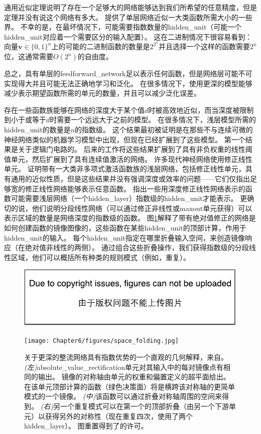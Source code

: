 通用近似定理说明了存在一个足够大的网络能够达到我们所希望的任意精度，但是定理并没有说这个网络有多大。
\cite{Barron93}提供了单层网络近似一大类函数所需大小的一些界。
不幸的是，在最坏情况下，可能需要指数数量的\gls{hidden_unit}（可能一个\gls{hidden_unit}对应着一个需要区分的输入配置）。
这在二进制情况下很容易看到：向量$\bm{v}\in \{0,1\}^n$上的可能的二进制函数的数量是$2^{2^n}$并且选择一个这样的函数需要$2^n$位，这通常需要$O(2^n)$的自由度。

总之，具有单层的\gls{feedforward_network}足以表示任何函数，但是网络层可能不可实现得大并且可能无法正确地学习和泛化。
在很多情况下，使用更深的模型能够减少表示期望函数所需的单元的数量，并且可以减少泛化误差。


存在一些函数族能够在网络的深度大于某个值$d$时被高效地近似，而当深度被限制到小于或等于$d$时需要一个远远大于之前的模型。
在很多情况下，浅层模型所需的\gls{hidden_unit}的数量是$n$的指数级。
这个结果最初被证明是在那些不与连续可微的神经网络类似的机器学习模型中出现，但现在已经扩展到了这些模型。
第一个结果是关于逻辑门电路的\citep{Hastad86}。
后来的工作将这些结果扩展到了具有非负权重的线性阈值单元\citep{Hastad91,Hajnal-et-al-1993}，然后扩展到了具有连续值激活的网络\citep{Maass-1992,Maass-et-al-1994}。
许多现代神经网络使用修正线性单元。
\cite{Leshno-et-al-1993}证明带有一大类非多项式激活函数族的浅层网络，包括修正线性单元，具有通用的近似性质，但是这些结果并没有强调深度或效率的问题——它们仅指出足够宽的修正线性网络能够表示任意函数。
\cite{Montufar-et-al-NIPS2014}指出一些用深度修正线性网络表示的函数可能需要浅层网络（一个\gls{hidden_layer}）指数级的\gls{hidden_unit}才能表示。
更确切的说，他们说明分段线性网络（可以通过修正非线性或maxout单元获得）可以表示区域的数量是网络深度的指数级的函数。
图\ref{fig:chap6_space_folding}解释了带有绝对值修正的网络是如何创建函数的镜像图像的，这些函数在某些\gls{hidden_unit}的顶部计算，作用于\gls{hidden_unit}的输入。
每个\gls{hidden_unit}指定在哪里折叠输入空间，来创造镜像响应（在绝对值非线性的两侧）。
通过组合这些折叠操作，我们获得指数级的分段线性区域，他们可以概括所有种类的规则模式（例如，重复）。
\begin{figure}[!htb]
\ifOpenSource
\centerline{\includegraphics{figure.pdf}}
\else
\centerline{\texttt{[image: Chapter6/figures/space\_folding.jpg]}}
\fi
\caption{%
关于更深的整流网络具有指数优势的一个直观的几何解释，来自\cite{Montufar-et-al-NIPS2014}。 
\emph{(左)}\gls{absolute_value_rectification}单元对其输入中的每对镜像点有相同的输出。
镜像的对称轴由单元的权重和偏置定义的超平面给出。 在该单元顶部计算的函数（绿色决策面）将是横跨该对称轴的更简单模式的一个镜像。 
\emph{(中)}该函数可以通过折叠对称轴周围的空间来得到。
\emph{(右)}另一个重复模式可以在第一个的顶部折叠（由另一个下游单元）以获得另外的对称性（现在重复四次，使用了两个\gls{hidden_layer}）。 
图重置得到了\cite{Montufar-et-al-NIPS2014}的许可。}
\label{fig:chap6_space_folding}
\end{figure}


